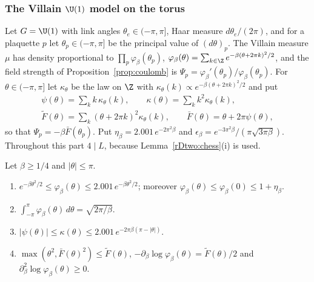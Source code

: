 \subsubsection{The Villain $\U(1)$ model on the torus}

Let $G=\U(1)$ with link angles $\theta_e\in(-\pi,\pi]$, Haar measure $d
\theta_e/(2\pi)$, and for a plaquette $p$ let $\theta_p\in(-\pi,\pi]$ be the
principal value of $(d\theta)_p$. The Villain measure $\mu$ has density
proportional to $\prod_p\varphi_\beta(\theta_p)$, $\varphi_\beta(\theta)=
\sum_{k\in\Z}e^{-\beta(\theta+2\pi k)^2/2}$, and the field strength of
Proposition~\ref{prop:coulomb} is $\Psi_p=\varphi_\beta'(\theta_p)/\varphi_
\beta(\theta_p)$. For $\theta\in(-\pi,\pi]$ let $\kappa_\theta$ be the law
on $\Z$ with $\kappa_\theta(k)\propto e^{-\beta(\theta+2\pi k)^2/2}$ and put
\begin{gather*}
\psi(\theta)=\sum_kk\,\kappa_\theta(k),\qquad\kappa(\theta)=\sum_kk^2
\kappa_\theta(k),\\
\tilde F(\theta)=\sum_k(\theta+2\pi k)^2\kappa_\theta(k),\qquad
\bar F(\theta)=\theta+2\pi\psi(\theta),
\end{gather*}
so that $\Psi_p=-\beta\bar F(
\theta_p)$. Put $\eta_\beta=2.001\,e^{-2\pi^2\beta}$ and $\epsilon_\beta=
e^{-3\pi^2\beta}/(\pi\sqrt{3\pi\beta})$. Throughout this part $4\mid L$,
because Lemma~\ref{rDtwo:chess}(i) is used.

\begin{lemma}\label{rDtwo:villainweight}
Let $\beta\ge1/4$ and $\lvert\theta\rvert\le\pi$.
\begin{enumerate}[label=\textup{(\roman*)},leftmargin=*]
\item $e^{-\beta\theta^2/2}\le\varphi_\beta(\theta)\le2.001\,e^{-\beta\theta^2
/2}$; moreover $\varphi_\beta(\theta)\le\varphi_\beta(0)\le1+\eta_\beta$.
\item $\int_{-\pi}^\pi\varphi_\beta(\theta)\,d\theta=\sqrt{2\pi/\beta}$.
\item $\lvert\psi(\theta)\rvert\le\kappa(\theta)\le2.001\,e^{-2\pi\beta(\pi-
\lvert\theta\rvert)}$.
\item $\max(\theta^2,\bar F(\theta)^2)\le\tilde F(\theta)$,
$-\partial_\beta\log\varphi_\beta(\theta)=\tilde F(\theta)/2$ and
$\partial_\beta^2\log\varphi_\beta(\theta)\ge0$.
\end{enumerate}
\end{lemma}

